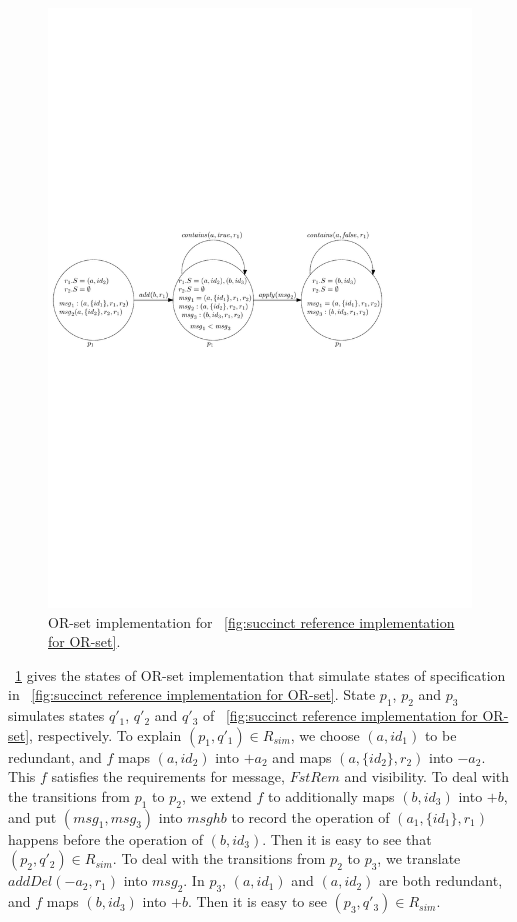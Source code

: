 \begin{figure}[t]
  \centering
  \includegraphics[width=0.8 \textwidth]{figures/PIC-OR-set-Implementation-Execution.pdf}
  \caption{OR-set implementation for \figurename~\ref{fig:succinct reference implementation for OR-set}.}
  \label{fig:or-set implemtation for succinct or-set specification}
\end{figure}

\figurename~\ref{fig:or-set implemtation for succinct or-set specification} gives the states of OR-set implementation that simulate states of specification in \figurename~\ref{fig:succinct reference implementation for OR-set}. State $p_1$, $p_2$ and $p_3$ simulates states $q'_1$, $q'_2$ and $q'_3$ of \figurename~\ref{fig:succinct reference implementation for OR-set}, respectively. To explain $(p_1,q'_1) \in R_{\mathit{sim}}$, we choose $(a,\mathit{id}_1)$ to be redundant, and $f$ maps $(a,\mathit{id}_2)$ into $+a_2$ and maps $(a,\{ \mathit{id}_2 \},r_2)$ into $-a_2$. This $f$ satisfies the requirements for message, $\mathit{FstRem}$ and visibility. To deal with the transitions from $p_1$ to $p_2$, we extend $f$ to additionally maps $(b,\mathit{id}_3)$ into $+b$, and put $(\mathit{msg}_1,\mathit{msg}_3)$ into $\mathit{msghb}$ to record the operation of $(a_1,\{ \mathit{id}_1 \},r_1)$ happens before the operation of $(b,\mathit{id}_3)$. Then it is easy to see that $(p_2,q'_2) \in R_{\mathit{sim}}$. To deal with the transitions from $p_2$ to $p_3$, we translate $\mathit{addDel}(-a_2,r_1)$ into $\mathit{msg}_2$. In $p_3$, $(a,\mathit{id}_1)$ and $(a,\mathit{id}_2)$ are both redundant, and $f$ maps $(b,\mathit{id}_3)$ into $+b$. Then it is easy to see $(p_3,q'_3) \in R_{\mathit{sim}}$.

